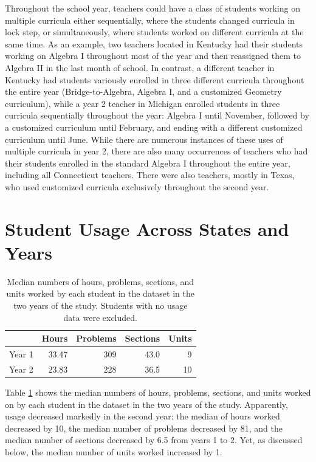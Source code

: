 \documentclass[notitlepage,12pt]{jedm}\usepackage[]{graphicx}\usepackage[]{color}
\begin{document}
Throughout the school year, teachers could have a class of students
working on multiple curricula either sequentially, where the students
changed curricula in lock step, or simultaneously, where students
worked on different curricula at the same time. As an example, two
teachers located in Kentucky had their students working on Algebra I
throughout most of the year and then reassigned them to Algebra II in
the last month of school. In contrast, a different teacher in Kentucky had students variously
enrolled in three different curricula throughout the entire year
(Bridge-to-Algebra, Algebra I, and a customized Geometry curriculum),
while a year 2 teacher in Michigan enrolled students in
three curricula sequentially throughout the year: Algebra I
until November, followed by a customized curriculum until February, and
ending with a different customized curriculum until June. While there are numerous instances of these
uses of multiple curricula in year 2, there are also many occurrences
of teachers who had their students enrolled in the standard Algebra I
throughout the entire year, including all Connecticut teachers.
There were also teachers, mostly in Texas, who used customized
curricula exclusively throughout the
second year.

\section{Student Usage Across States and Years}\label{sec:usage}

\begin{table}[ht]
\centering
\begin{tabular}{rrrrr}
  \hline
 & Hours & Problems & Sections & Units \\ 
  \hline
Year 1 & 33.47 & 309 & 43.0 & 9 \\ 
  Year 2 & 23.83 & 228 & 36.5 & 10 \\ 
   \hline
\end{tabular}
\caption{Median numbers of hours, problems, sections, and units worked by each student in the dataset in the two years of the study. Students with no usage data were excluded.} 
\label{tab:medUsage}
\end{table}



Table \ref{tab:medUsage} shows the median numbers of hours,
problems, sections, and units worked on by each student in the dataset
in the two years of the study.
Apparently, usage decreased markedly in the second year: the median
of hours worked decreased by
10, the median number of problems decreased by
81, and
the median number of sections decreased by
6.5 from
years 1 to 2.
Yet, as discussed below, the median number of units worked increased
by 1.
\end{document}
